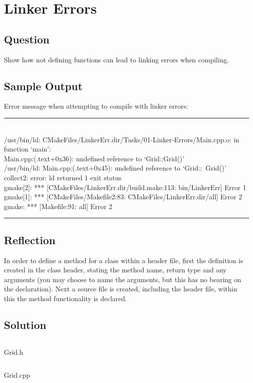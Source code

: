 \section{Linker Errors}
    \subsection*{Question}
        Show how not defining functions can lead to linking errors when 
        compiling.

    \subsection*{Sample Output}
        Error message when attempting to compile with linker errors:

        \par\noindent\rule{\textwidth}{0.5pt}\\{\scriptsize
            \noindent/usr/bin/ld: CMakeFiles/LinkerErr.dir/Tasks/01-Linker-Errors/Main.cpp.o: in function `main':\\
            Main.cpp:(.text+0x36): undefined reference to `Grid::Grid()'\\
            /usr/bin/ld: Main.cpp:(.text+0x45): undefined reference to `Grid::~Grid()'\\
            collect2: error: ld returned 1 exit status\\
            gmake[2]: *** [CMakeFiles/LinkerErr.dir/build.make:113: bin/LinkerErr] Error 1\\
            gmake[1]: *** [CMakeFiles/Makefile2:83: CMakeFiles/LinkerErr.dir/all] Error 2\\
            gmake: *** [Makefile:91: all] Error 2
        }\par\noindent\rule{\textwidth}{0.5pt}

    \subsection*{Reflection}
        In order to define a method for a class within a header file,
        first the definition is created in the class header,
        stating the method name, return type and any arguments
        (you may choose to name the arguments, but this has no bearing on the declaration).
        Next a source file is created, including the header file,
        within this the method functionality is declared.
    
    \subsection*{Solution}
        \begin{listing}[H]
            \inputminted{cpp}{../Tasks/01-Linker-Errors/Grid.h}
            \caption{Grid.h}
        \end{listing}
        
        \begin{listing}[H]
            \inputminted{cpp}{../Tasks/01-Linker-Errors/Grid.cpp}
            \caption{Grid.cpp}
        \end{listing}